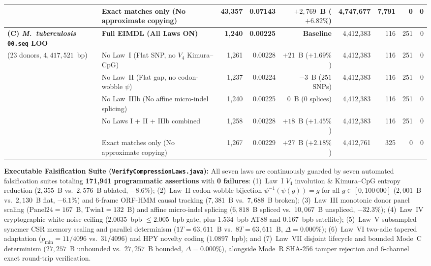 \documentclass[10pt]{article}
\theoremstyle{definition}
\begin{document}
\begin{table}[h!]
{\begin{tabular}{llrrrrrrr}
 & Exact matches only (No approximate copying) & 43,357 & 0.07143 & $+2,769$~B ($+6.82\%$) & 4,747,677 & 7,791 & 0 & 0 \\
\midrule
\textbf{(C) \textit{M.~tuberculosis} \texttt{00.seq} LOO} & \textbf{Full EIMDL (All Laws ON)} & \textbf{1,240} & \textbf{0.00225} & \textbf{Baseline} & 4,412,383 & 116 & 251 & 0 \\
(23 donors, $4,417,521$~bp) & No Law~I (Flat SNP, no $V_4$ Kimura--CpG) & 1,261 & 0.00228 & $+21$~B ($+1.69\%$) & 4,412,383 & 116 & 251 & 0 \\
 & No Law~II (Flat gap, no codon-wobble $\psi$) & 1,237 & 0.00224 & $-3$~B ($251$ SNPs) & 4,412,383 & 116 & 251 & 0 \\
 & No Law~IIIb (No affine micro-indel splicing) & 1,240 & 0.00225 & $0$~B ($0$ splices) & 4,412,383 & 116 & 251 & 0 \\
 & No Laws I + II + IIIb combined & 1,258 & 0.00228 & $+18$~B ($+1.45\%$) & 4,412,383 & 116 & 251 & 0 \\
 & Exact matches only (No approximate copying) & 1,267 & 0.00229 & $+27$~B ($+2.18\%$) & 4,412,761 & 325 & 0 & 0 \\
\bottomrule
\end{tabular}%
}
\end{table}

\noindent
\textbf{Executable Falsification Suite (\texttt{VerifyCompressionLaws.java}):}
All seven laws are continuously guarded by seven automated falsification suites totaling \textbf{171,941 programmatic assertions} with \textbf{0 failures}:
(1)~Law~I $V_4$ involution \& Kimura--CpG entropy reduction ($2,355$~B vs.\ $2,576$~B ablated, $-8.6\%$);
(2)~Law~II codon-wobble bijection $\psi^{-1}(\psi(g))=g$ for all $g \in [0, 100\,000]$ ($2,001$~B vs.\ $2,130$~B flat, $-6.1\%$) and 6-frame ORF-HMM causal tracking ($7,381$~B vs.\ $7,688$~B broken);
(3)~Law~III monotonic donor panel scaling ($\text{Panel24}=167$~B, $\text{Twin1}=132$~B) and affine micro-indel splicing ($6,818$~B spliced vs.\ $10,067$~B unspliced, $-32.3\%$);
(4)~Law~IV cryptographic white-noise ceiling ($2.0035$~bpb $\le 2.005$~bpb gate, plus $1.534$~bpb AT88 and $0.167$~bpb satellite);
(5)~Law~V subsampled syncmer CSR memory scaling and parallel determinism ($1T=63,611$~B vs.\ $8T=63,611$~B, $\Delta=0.000\%$);
(6)~Law~VI two-adic tapered adaptation ($p_{\min} = 11/4096$ vs.\ $31/4096$) and HPY novelty coding ($1.0897$~bpb); and
(7)~Law~VII disjoint lifecycle and bounded Mode~C determinism ($27,257$~B unbounded vs.\ $27,257$~B bounded, $\Delta=0.000\%$), alongside Mode~R SHA-256 tamper rejection and 6-channel exact round-trip verification.
\end{document}
